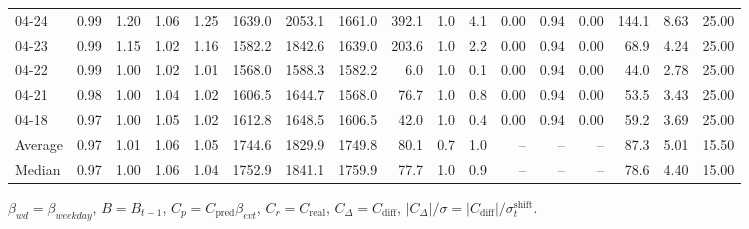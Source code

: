 \begin{threeparttable}
{\begin{tabular}{lrrrrrrrrrrrrrrrr}
  04-24 &         0.99 &           1.20 &          1.06 &          1.25 & 1639.0 & 2053.1 & 1661.0 &      392.1 &                      1.0 &                 4.1 &       0.00 &      0.94 &           0.00 &            144.1 &            8.63 &                  25.00 \\
  04-23 &         0.99 &           1.15 &          1.02 &          1.16 & 1582.2 & 1842.6 & 1639.0 &      203.6 &                      1.0 &                 2.2 &       0.00 &      0.94 &           0.00 &             68.9 &            4.24 &                  25.00 \\
  04-22 &         0.99 &           1.00 &          1.02 &          1.01 & 1568.0 & 1588.3 & 1582.2 &        6.0 &                      1.0 &                 0.1 &       0.00 &      0.94 &           0.00 &             44.0 &            2.78 &                  25.00 \\
  04-21 &         0.98 &           1.00 &          1.04 &          1.02 & 1606.5 & 1644.7 & 1568.0 &       76.7 &                      1.0 &                 0.8 &       0.00 &      0.94 &           0.00 &             53.5 &            3.43 &                  25.00 \\
  04-18 &         0.97 &           1.00 &          1.05 &          1.02 & 1612.8 & 1648.5 & 1606.5 &       42.0 &                      1.0 &                 0.4 &       0.00 &      0.94 &           0.00 &             59.2 &            3.69 &                  25.00 \\
Average &         0.97 &           1.01 &          1.06 &          1.05 & 1744.6 & 1829.9 & 1749.8 &       80.1 &                      0.7 &                 1.0 &         -- &        -- &             -- &             87.3 &            5.01 &                  15.50 \\
 Median &         0.97 &           1.00 &          1.06 &          1.04 & 1752.9 & 1841.1 & 1759.9 &       77.7 &                      1.0 &                 0.9 &         -- &        -- &             -- &             78.6 &            4.40 &                  15.00 \\
\bottomrule
\end{tabular}
}
\begin{tablenotes}\footnotesize
\item $\beta_{wd}=\beta_{weekday}$, $B=B_{t-1}$,
$C_p=C_{\text{pred}}\beta_{evt}$, $C_r=C_{\text{real}}$,
$C_\Delta=C_{\text{diff}}$, $|C_\Delta|/\sigma=|C_{\text{diff}}|/\sigma_t^{\text{shift}}$.
\end{tablenotes}
\end{threeparttable}
\endgroup
